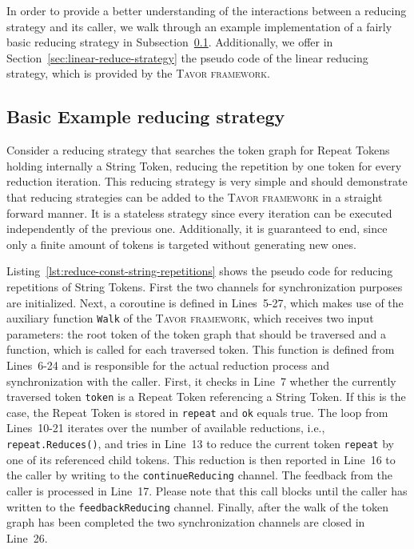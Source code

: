 In order to provide a better understanding of the interactions between a reducing strategy and its caller, we walk through an example implementation of a fairly basic reducing strategy in Subsection~\ref{sec:basic-reduce-strategy}. Additionally, we offer in Section~\ref{sec:linear-reduce-strategy} the pseudo code of the linear reducing strategy, which is provided by the \textsc{Tavor framework}.

\subsection{Basic Example reducing strategy}
\label{sec:basic-reduce-strategy}

Consider a reducing strategy that searches the token graph for Repeat Tokens holding internally a String Token, reducing the repetition by one token for every reduction iteration. This reducing strategy is very simple and should demonstrate that reducing strategies can be added to the \textsc{Tavor framework} in a straight forward manner. It is a stateless strategy since every iteration can be executed independently of the previous one. Additionally, it is guaranteed to end, since only a finite amount of tokens is targeted without generating new ones.

Listing~\ref{lst:reduce-const-string-repetitions} shows the pseudo code for reducing repetitions of String Tokens. First the two channels for synchronization purposes are initialized. Next, a coroutine is defined in Lines~5-27, which makes use of the auxiliary function \texttt{Walk} of the \textsc{Tavor framework}, which receives two input parameters: the root token of the token graph that should be traversed and a function, which is called for each traversed token. This function is defined from Lines~6-24 and is responsible for the actual reduction process and synchronization with the caller. First, it checks in Line~7 whether the currently traversed token \texttt{token} is a Repeat Token referencing a String Token. If this is the case, the Repeat Token is stored in \texttt{repeat} and \texttt{ok} equals true. The loop from Lines~10-21 iterates over the number of available reductions, i.e., \texttt{repeat.Reduces()}, and tries in Line~13 to reduce the current token \texttt{repeat} by one of its referenced child tokens. This reduction is then reported in Line~16 to the caller by writing to the \texttt{continueReducing} channel. The feedback from the caller is processed in Line~17. Please note that this call blocks until the caller has written to the \texttt{feedbackReducing} channel. Finally, after the walk of the token graph has been completed the two synchronization channels are closed in Line~26.

